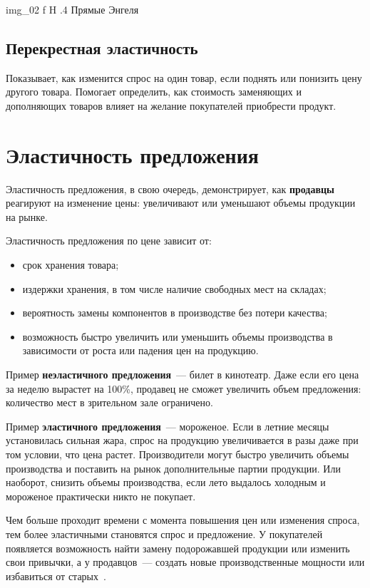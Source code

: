 {img_02}
{f}
{H}
{.4\textwidth}
{Прямые Энгеля~\cite{elast2}}

\subsection{Перекрестная эластичность}
Показывает, как изменится спрос на один товар, если поднять или понизить цену другого товара. 
Помогает определить, как стоимость заменяющих и дополняющих товаров влияет на желание покупателей приобрести продукт.

\section{Эластичность предложения}

Эластичность предложения, в свою очередь, демонстрирует, как \textbf{продавцы} реагируют на изменение цены: увеличивают или уменьшают объемы продукции на рынке. 

Эластичность предложения по цене зависит от:
\begin{itemize}
	\item срок хранения товара;
	\item издержки хранения, в том числе наличие свободных мест на складах;
	\item вероятность замены компонентов в производстве без потери качества;
	\item возможность быстро увеличить или уменьшить объемы производства в зависимости от роста или падения цен на продукцию.
\end{itemize}

Пример \textbf{неэластичного предложения}~--- билет в кинотеатр. 
Даже если его цена за неделю вырастет на 100\%, продавец не сможет увеличить объем предложения: количество мест в зрительном зале ограничено.

Пример \textbf{эластичного предложения}~--- мороженое. 
Если в летние месяцы установилась сильная жара, спрос на продукцию увеличивается в разы даже при том условии, что цена растет. 
Производители могут быстро увеличить объемы производства и поставить на рынок дополнительные партии продукции. 
Или наоборот, снизить объемы производства, если лето выдалось холодным и мороженое практически никто не покупает.

Чем больше проходит времени с момента повышения цен или изменения спроса, тем более эластичными становятся спрос и предложение. 
У покупателей появляется возможность найти замену подорожавшей продукции или изменить свои привычки, а у продавцов~--- создать новые производственные мощности или избавиться от старых~\cite{elast1}.